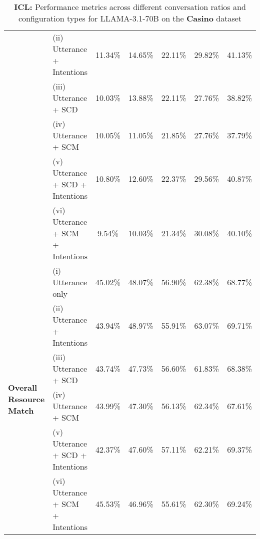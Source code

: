 \begin{table*}[ht]
\begin{tabular}{llccccc}
 & (ii) Utterance + Intentions & \cellcolor{red!25}11.34\% & \cellcolor{green!25}14.65\% & \cellcolor{red!25}22.11\% & \cellcolor{green!25}29.82\% & \cellcolor{red!25}41.13\% \\
 & (iii) Utterance + SCD & \cellcolor{red!25}10.03\% & \cellcolor{green!25}13.88\% & \cellcolor{red!25}22.11\% & \cellcolor{red!25}27.76\% & \cellcolor{red!25}38.82\% \\
 & (iv) Utterance + SCM & \cellcolor{red!25}10.05\% & \cellcolor{red!25}11.05\% & \cellcolor{red!25}21.85\% & \cellcolor{red!25}27.76\% & \cellcolor{red!25}37.79\% \\
 & (v) Utterance + SCD + Intentions & \cellcolor{red!25}10.80\% & \cellcolor{red!25}12.60\% & \cellcolor{red!25}22.37\% & \cellcolor{red!25}29.56\% & \cellcolor{red!25}40.87\% \\
 & (vi) Utterance + SCM + Intentions & \cellcolor{red!25}9.54\% & \cellcolor{red!25}10.03\% & \cellcolor{red!25}21.34\% & \cellcolor{green!25}30.08\% & \cellcolor{red!25}40.10\% \\
\midrule
\multirow{6}{*}{\textbf{Overall Resource Match}} & (i) Utterance only & 45.02\% & 48.07\% & 56.90\% & 62.38\% & 68.77\% \\
 & (ii) Utterance + Intentions & \cellcolor{red!25}43.94\% & \cellcolor{green!25}48.97\% & \cellcolor{red!25}55.91\% & \cellcolor{green!25}63.07\% & \cellcolor{green!25}69.71\% \\
 & (iii) Utterance + SCD & \cellcolor{red!25}43.74\% & \cellcolor{red!25}47.73\% & \cellcolor{red!25}56.60\% & \cellcolor{red!25}61.83\% & \cellcolor{red!25}68.38\% \\
 & (iv) Utterance + SCM & \cellcolor{red!25}43.99\% & \cellcolor{red!25}47.30\% & \cellcolor{red!25}56.13\% & \cellcolor{red!25}62.34\% & \cellcolor{red!25}67.61\% \\
 & (v) Utterance + SCD + Intentions & \cellcolor{red!25}42.37\% & \cellcolor{red!25}47.60\% & \cellcolor{green!25}57.11\% & \cellcolor{red!25}62.21\% & \cellcolor{green!25}69.37\% \\
 & (vi) Utterance + SCM + Intentions & \cellcolor{green!25}45.53\% & \cellcolor{red!25}46.96\% & \cellcolor{red!25}55.61\% & \cellcolor{red!25}62.30\% & \cellcolor{green!25}69.24\% \\
\hline
\end{tabular}
\caption{\textbf{ICL: }Performance metrics across different conversation ratios and configuration types for LLAMA-3.1-70B on the \textbf{Casino} dataset}
\label{tab:combined_metrics_icl_llama_casino_by_ratio}
\end{table*}